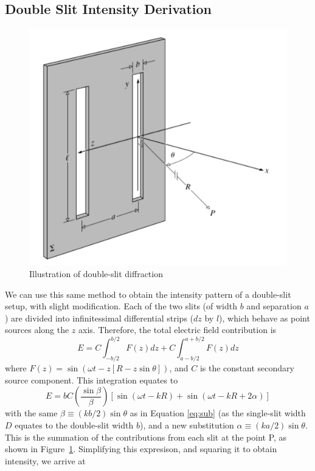 \documentclass[a4paper]{article}
\begin{document}
\subsection{Double Slit Intensity Derivation} \label{sec:double}
\begin{figure}[h]
  \centerline{\includegraphics[scale=0.17]{double.png}}
  \captionsetup{justification=centering}
  \caption{Illustration of double-slit diffraction \cite[Fig.\ 10.17]{RefWorks:doc:60689ea38f08cf86c9dc700e}}
  \label{fig:double}
\end{figure}
We can use this same method to obtain the intensity pattern of a double-slit setup, with slight modification. Each of the two slits (of width $b$ and separation $a$) are divided into infinitessimal differential strips ($dz$ by $l$), which behave as point sources along the $z$ axis. Therefore, the total electric field contribution is 
\begin{equation}
E=C\int^{b/2}_{-b/2}F(z)dz+C\int^{a+b/2}_{a-b/2}F(z)dz
\end{equation}
where $F(z)=\sin(\omega t-z[R-z\sin\theta])$, and $C$ is the constant secondary source component. This integration equates to
\begin{equation}
E=bC\left(\frac{\sin\beta}\beta\right)[\sin(\omega t-kR)+\sin(\omega t-kR+2\alpha)]
\end{equation} with the same $\beta\equiv(kb/2)\sin\theta$ as in Equation \ref{eq:sub} (as the single-slit width $D$ equates to the double-slit width $b$), and a new substitution $\alpha\equiv(ka/2)\sin\theta$. This is the summation of the contributions from each slit at the point P, as shown in Figure~\ref{fig:double}. Simplifying this expresison, and squaring it to obtain intensity, we arrive at 
\end{document}
